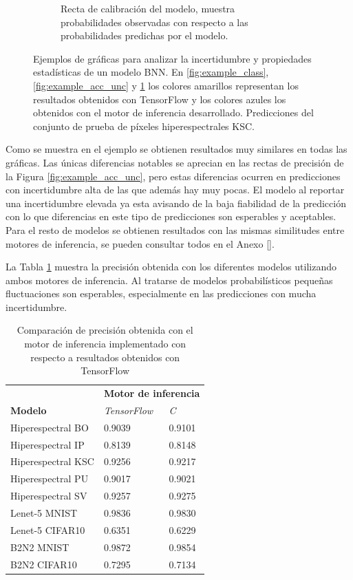 \begin{figure}[h]
\begin{subfigure}[b]{0.48\textwidth}
         \caption{Recta de calibración del modelo, muestra probabilidades observadas con respecto a las probabilidades predichas por el modelo.}
         \label{fig:example_calibration}
     \end{subfigure}
        \caption{Ejemplos de gráficas para analizar la incertidumbre y propiedades estadísticas de un modelo BNN. En \ref{fig:example_class}, \ref{fig:example_acc_unc} y \ref{fig:example_calibration} los colores amarillos representan los resultados obtenidos con TensorFlow y los colores azules los obtenidos con el motor de inferencia desarrollado. Predicciones del conjunto de prueba de píxeles hiperespectrales KSC.}
        \label{fig:figure_example}
\end{figure}

Como se muestra en el ejemplo se obtienen resultados muy similares en todas las gráficas. Las únicas diferencias notables se aprecian en las rectas de precisión de la Figura \ref{fig:example_acc_unc}, pero estas diferencias ocurren en predicciones con incertidumbre alta de las que además hay muy pocas. El modelo al reportar una incertidumbre elevada ya esta avisando de la baja fiabilidad de la predicción con lo que diferencias en este tipo de predicciones son esperables y aceptables. Para el resto de modelos se obtienen resultados con las mismas similitudes entre motores de inferencia, se pueden consultar todos en el Anexo \ref{}. \todo

La Tabla \ref{tab:engine_acc} muestra la precisión obtenida con los diferentes modelos utilizando ambos motores de inferencia. Al tratarse de modelos probabilísticos pequeñas fluctuaciones son esperables, especialmente en las predicciones con mucha incertidumbre.

\begin{table}[ht]
\centering
\caption{Comparación de precisión obtenida con el motor de inferencia implementado con respecto a resultados obtenidos con TensorFlow}
\label{tab:engine_acc}
\begin{tabular}{lll}
\hline
 &  \multicolumn{2}{c}{\textbf{Motor de inferencia}}\\
 \textbf{Modelo} & \textit{TensorFlow} & \textit{C} \\ \hline
 Hiperespectral BO   & 0.9039 & 0.9101 \\
 Hiperespectral IP   & 0.8139 & 0.8148 \\
 Hiperespectral KSC  & 0.9256 & 0.9217 \\
 Hiperespectral PU   & 0.9017 & 0.9021 \\
 Hiperespectral SV   & 0.9257 & 0.9275 \\
 Lenet-5 MNIST      & 0.9836 & 0.9830 \\
 Lenet-5 CIFAR10    & 0.6351 & 0.6229 \\
 B2N2 MNIST         & 0.9872 & 0.9854 \\
 B2N2 CIFAR10       & 0.7295 & 0.7134 \\\hline
\end{tabular}
\end{table}

